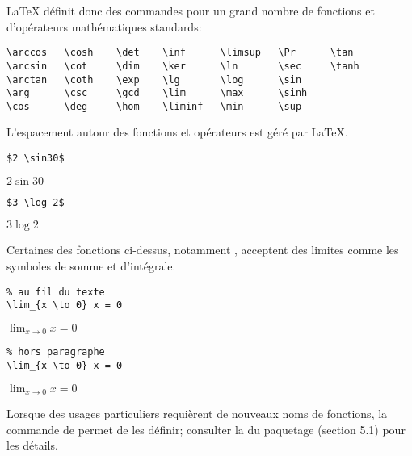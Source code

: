 {\LaTeX} définit donc des commandes pour un grand nombre de fonctions
et d'opérateurs mathématiques standards:
\begin{lstlisting}
\arccos   \cosh    \det    \inf      \limsup   \Pr      \tan
\arcsin   \cot     \dim    \ker      \ln       \sec     \tanh
\arctan   \coth    \exp    \lg       \log      \sin
\arg      \csc     \gcd    \lim      \max      \sinh
\cos      \deg     \hom    \liminf   \min      \sup
\end{lstlisting}
L'espacement autour des fonctions et opérateurs est géré par {\LaTeX}.
\begin{demo}
  \begin{minipage}{0.45\linewidth}
    \begin{texample}
\begin{lstlisting}
$2 \sin30$
\end{lstlisting}
      \producing
      $2 \sin30$
    \end{texample}
  \end{minipage}
  \hfill
  \begin{minipage}{0.45\linewidth}
    \begin{texample}
\begin{lstlisting}
$3 \log 2$
\end{lstlisting}
      \producing
      $3 \log 2$
    \end{texample}
  \end{minipage}
\end{demo}

Certaines des fonctions ci-dessus, notamment \cmd{\lim}, acceptent des
limites comme les symboles de somme et d'intégrale.
\begin{demo}
  \begin{texample}
\begin{lstlisting}
% au fil du texte
\lim_{x \to 0} x = 0
\end{lstlisting}
    \producing $\lim_{x \to 0} x = 0$
  \end{texample}

  \begin{texample}
\begin{lstlisting}
% hors paragraphe
\lim_{x \to 0} x = 0
\end{lstlisting}
    \producing $\displaystyle \lim_{x \to 0} x = 0$
  \end{texample}
\end{demo}

Lorsque des usages particuliers requièrent de nouveaux noms de
fonctions, la commande \cmd{\DeclareMathOperator} de 
permet de les définir; consulter la %
du paquetage (section 5.1) pour les détails.



